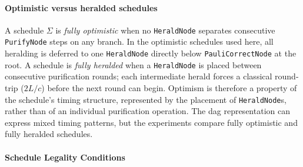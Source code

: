 \vspace{0.5cm}

\paragraph{Optimistic versus heralded schedules}
A schedule $\Sigma$ is \emph{fully optimistic} when no \texttt{HeraldNode} separates consecutive \texttt{PurifyNode} steps on any branch. In the optimistic schedules used here, all heralding is deferred to one \texttt{HeraldNode} directly below \texttt{PauliCorrectNode} at the root. A schedule is \emph{fully heralded} when a \texttt{HeraldNode} is placed between consecutive purification rounds; each intermediate herald forces a classical round-trip ($2L/c$) before the next round can begin. Optimism is therefore a property of the schedule's timing structure, represented by the placement of \texttt{HeraldNode}s, rather than of an individual purification operation. The \Gls{dag} representation can express mixed timing patterns, but the experiments compare fully optimistic and fully heralded schedules.

\vspace{0.5cm}

\paragraph{Schedule Legality Conditions}
\label{sec:model:legality}

